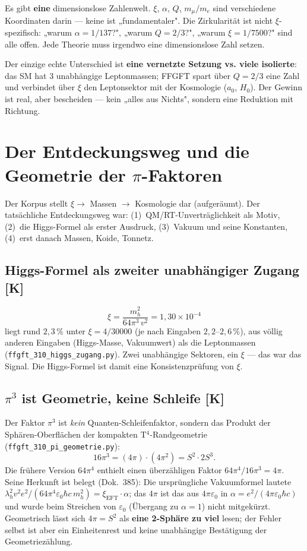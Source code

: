 Es gibt \textbf{eine} dimensionslose Zahlenwelt. $\xi$, $\alpha$, $Q$,
$m_\mu/m_e$ sind verschiedene Koordinaten darin — keine ist
„fundamentaler". Die Zirkularität ist nicht $\xi$-spezifisch: „warum
$\alpha = 1/137$?", „warum $Q = 2/3$?", „warum $\xi = 1/7500$?" sind
alle offen. Jede Theorie muss irgendwo eine dimensionslose Zahl setzen.

Der einzige echte Unterschied ist \textbf{eine vernetzte Setzung vs.
viele isolierte}: das SM hat 3 unabhängige Leptonmassen; FFGFT spart
über $Q = 2/3$ eine Zahl und verbindet über $\xi$ den Leptonsektor mit
der Kosmologie ($a_0$, $H_0$). Der Gewinn ist real, aber bescheiden —
kein „alles aus Nichts", sondern eine Reduktion mit Richtung.

\chapter{Der Entdeckungsweg und die Geometrie der \texorpdfstring{$\pi$}{pi}-Faktoren}

Der Korpus stellt $\xi \to$ Massen $\to$ Kosmologie dar (aufgeräumt).
Der tatsächliche Entdeckungsweg war: (1)~QM/RT-Unverträglichkeit als
Motiv, (2)~die Higgs-Formel als erster Ausdruck, (3)~Vakuum und seine
Konstanten, (4)~erst danach Massen, Koide, Tonnetz.

\section{Higgs-Formel als zweiter unabhängiger Zugang [K]}

\[
  \xi = \frac{m_h^2}{64\pi^3\, v^2} = 1{,}30 \times 10^{-4}
\]
liegt rund $2{,}3\,\%$ unter $\xi = 4/30000$ (je nach Eingaben
$2{,}2$--$2{,}6\,\%$), aus völlig anderen Eingaben
(Higgs-Masse, Vakuumwert) als die Leptonmassen
(\texttt{ffgft\_310\_higgs\_zugang.py}). Zwei unabhängige Sektoren,
ein $\xi$ — das war das Signal. Die Higgs-Formel ist damit eine
Konsistenzprüfung von $\xi$.

\section{$\pi^3$ ist Geometrie, keine Schleife [K]}

Der Faktor $\pi^3$ ist \emph{kein} Quanten-Schleifenfaktor, sondern das
Produkt der Sphären-Oberflächen der kompakten T$^4$-Randgeometrie
(\texttt{ffgft\_310\_pi\_geometrie.py}):
\[
  16\pi^3 = (4\pi)\cdot(4\pi^2) = S^2 \cdot 2S^3.
\]
Die frühere Version $64\pi^4$ enthielt einen überzähligen Faktor
$64\pi^4 / 16\pi^3 = 4\pi$. Seine Herkunft ist belegt (Dok.~385): Die
ursprüngliche Vakuumformel lautete
$\lambda_h^2 v^2 e^2/(64\pi^4\varepsilon_0\hbar c\, m_h^2) = \xi_{\text{EFT}}\cdot\alpha$;
das $4\pi$ ist das aus $4\pi\varepsilon_0$ in
$\alpha = e^2/(4\pi\varepsilon_0\hbar c)$ und wurde beim Streichen von
$\varepsilon_0$ (Übergang zu $\alpha = 1$) nicht mitgekürzt. Geometrisch
lässt sich $4\pi = S^2$ als \textbf{eine 2-Sphäre zu viel} lesen; der
Fehler selbst ist aber ein Einheitenrest und keine unabhängige
Bestätigung der Geometriezählung.

